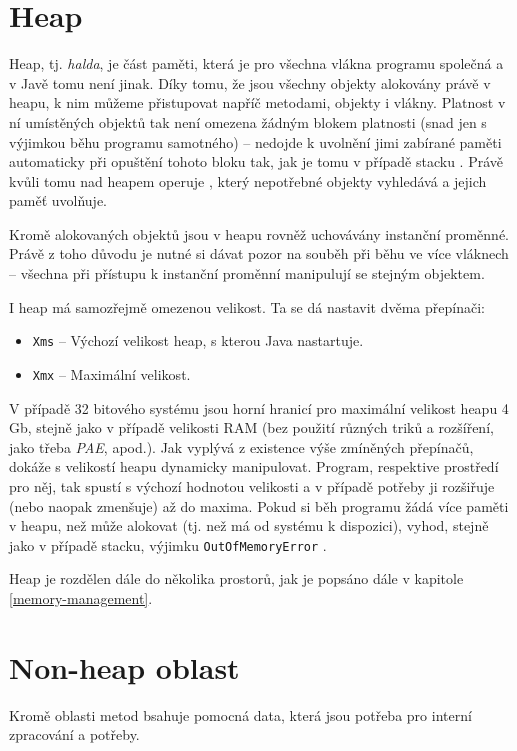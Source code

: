 \section{Heap}
Heap, tj. \textit{halda}, je část paměti, která je pro všechna vlákna programu společná a v Javě tomu není jinak. Díky tomu, že jsou všechny objekty alokovány právě v heapu, k nim můžeme přistupovat napříč metodami, objekty i vlákny. Platnost v ní umístěných objektů tak není omezena žádným blokem platnosti (snad jen s výjimkou běhu programu samotného) -- nedojde k uvolnění jimi zabírané paměti automaticky při opuštění tohoto bloku tak, jak je tomu v případě stacku \cite{java-heap-1}\cite{java-heap-2}. Právě kvůli tomu nad heapem operuje , který nepotřebné objekty vyhledává a jejich paměť uvolňuje.

Kromě alokovaných objektů jsou v heapu rovněž uchovávány instanční proměnné. Právě z toho důvodu je nutné si dávat pozor na souběh při běhu ve více vláknech --  všechna při přístupu k instanční proměnní manipulují se stejným objektem.

I heap má samozřejmě omezenou velikost. Ta se dá nastavit dvěma přepínači:

\begin{itemize}
	\item \texttt{Xms} -- Výchozí velikost heap, s kterou Java nastartuje.
	\item \texttt{Xmx} -- Maximální velikost.
\end{itemize}

V případě 32 bitového systému jsou horní hranicí pro maximální velikost heapu 4 Gb, stejně jako v případě velikosti RAM (bez použití různých triků a rozšíření, jako třeba \textit{PAE}, apod.). Jak vyplývá z existence výše zmíněných přepínačů,  dokáže s velikostí heapu dynamicky manipulovat. Program, respektive prostředí pro něj, tak spustí s výchozí hodnotou velikosti a v případě potřeby ji rozšiřuje (nebo naopak zmenšuje) až do maxima. Pokud si běh programu žádá více paměti v heapu, než může  alokovat (tj. než má od systému k dispozici), vyhod, stejně jako v případě stacku, výjimku \texttt{OutOfMemoryError} \cite{jvm-hotspot}. 

Heap je rozdělen dále do několika prostorů, jak je popsáno dále v kapitole \ref{memory-management}.

\section{Non-heap oblast}
Kromě oblasti metod bsahuje pomocná data, která jsou potřeba pro interní zpracování a potřeby. 

